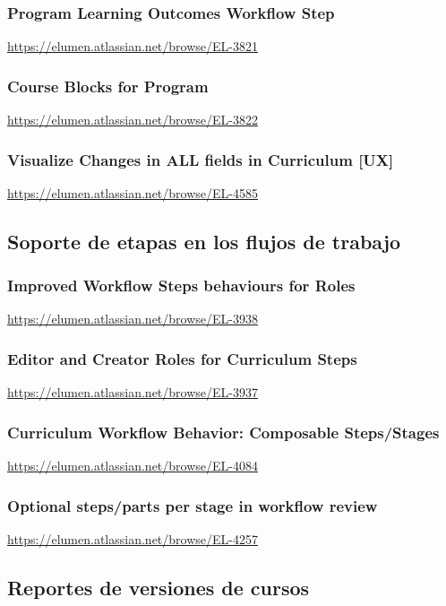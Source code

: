\subsubsection{Program Learning Outcomes Workflow Step}
\url{https://elumen.atlassian.net/browse/EL-3821}

\subsubsection{Course Blocks for Program}
\url{https://elumen.atlassian.net/browse/EL-3822}

\subsubsection{Visualize Changes in ALL fields in Curriculum [UX]}
\url{https://elumen.atlassian.net/browse/EL-4585}

\subsection{Soporte de etapas en los flujos de trabajo}
\subsubsection{Improved Workflow Steps behaviours for Roles}
\url{https://elumen.atlassian.net/browse/EL-3938}

\subsubsection{Editor and Creator Roles for Curriculum Steps}
\url{https://elumen.atlassian.net/browse/EL-3937}

\subsubsection{Curriculum Workflow Behavior: Composable Steps/Stages}
\url{https://elumen.atlassian.net/browse/EL-4084}

\subsubsection{Optional steps/parts per stage in workflow review}
\url{https://elumen.atlassian.net/browse/EL-4257}

\subsection{Reportes de versiones de cursos}
